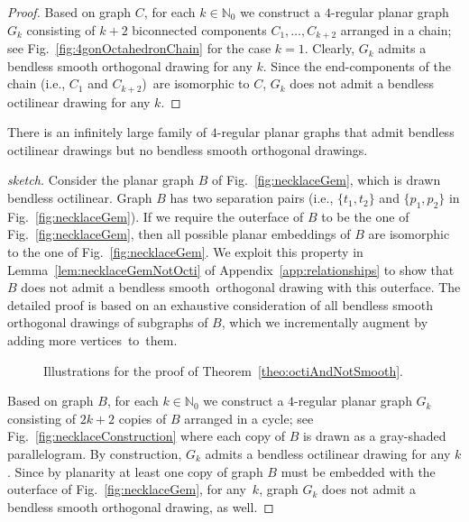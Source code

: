 \begin{proof}
Based on graph $C$, for each $k \in \mathbb{N}_0$ we construct a $4$-regular planar graph $G_k$ consisting of $k + 2$ biconnected components $C_1,\ldots,C_{k+2}$ arranged in a chain; see Fig.~\ref{fig:4gonOctahedronChain} for the case $k=1$. Clearly, $G_k$ admits a bendless smooth orthogonal drawing for any $k$. Since the end-components of the chain (i.e., $C_1$ and $C_{k+2}$)~are isomorphic to $C$, $G_k$ does not admit a bendless octilinear drawing for any $k$.
\end{proof}

\begin{theorem}
There is an infinitely large family of $4$-regular planar graphs that admit bendless octilinear drawings but no bendless smooth orthogonal drawings.
\label{theo:octiAndNotSmooth}
\end{theorem}
\begin{proof}[sketch]
Consider the planar graph $B$ of Fig.~\ref{fig:necklaceGem}, which is drawn bendless octilinear. Graph $B$ has two separation pairs (i.e., $\{t_1,t_2\}$ and $\{p_1,p_2\}$ in Fig.~\ref{fig:necklaceGem}). If we require the outerface of $B$ to be the one of Fig.~\ref{fig:necklaceGem}, then all possible planar embeddings of $B$ are isomorphic to the one of Fig.~\ref{fig:necklaceGem}. We exploit this property in Lemma~\ref{lem:necklaceGemNotOcti} of Appendix~\ref{app:relationships} to show that $B$ does not admit a bendless smooth~orthogonal drawing with this outerface. The detailed proof is based on an exhaustive consideration of all bendless smooth orthogonal drawings of subgraphs of $B$, which we incrementally augment by adding more vertices~to~them.


\begin{figure}[h]
	\centering
	\hfil
	\caption{Illustrations for the proof of Theorem~\ref{theo:octiAndNotSmooth}.}
	\label{fig:necklace}
\end{figure}

Based on graph $B$, for each $k \in \mathbb{N}_0$ we construct a $4$-regular planar graph $G_k$ consisting of $2k + 2$ copies of $B$ arranged in a cycle; see Fig.~\ref{fig:necklaceConstruction} where each copy of $B$ is drawn as a gray-shaded parallelogram. By construction, $G_k$ admits a bendless octilinear drawing for any $k$. Since by planarity at least one copy of graph $B$ must be embedded with the outerface of Fig.~\ref{fig:necklaceGem}, for any~$k$, graph $G_k$ does not admit a bendless smooth orthogonal drawing, as well.
\end{proof}






